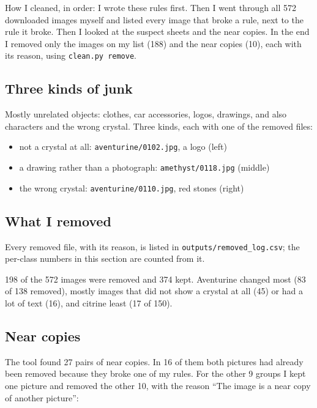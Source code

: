 \documentclass[11pt]{article}
\begin{document}
How I cleaned, in order: I wrote these rules first. Then I went through all
572 downloaded images myself and listed every image that broke a rule, next to
the rule it broke. Then I looked at the suspect sheets and the near copies. In
the end I removed only the images on my list (188) and the near copies (10),
each with its reason, using \texttt{clean.py remove}.

\subsection*{Three kinds of junk}
Mostly unrelated objects: clothes, car accessories, logos, drawings, and also
characters and the wrong crystal. Three kinds, each with one of the removed
files:

\begin{itemize}
\item not a crystal at all: \texttt{aventurine/0102.jpg}, a logo (left)
\item a drawing rather than a photograph: \texttt{amethyst/0118.jpg} (middle)
\item the wrong crystal: \texttt{aventurine/0110.jpg}, red stones (right)
\end{itemize}

\hfill
{}\hfill
{}

\subsection*{What I removed}

Every removed file, with its reason, is listed in
\texttt{outputs/removed\_log.csv}; the per-class numbers in this section are
counted from it.

198 of the 572 images were removed and 374 kept. Aventurine changed most (83 of
138 removed), mostly images that did not show a crystal at all (45) or had a lot
of text (16), and citrine least (17 of 150).

\subsection*{Near copies}
The tool found 27 pairs of near copies. In 16 of them both pictures had already
been removed because they broke one of my rules. For the other 9 groups I kept
one picture and removed the other 10, with the reason ``The image is a near copy
of another picture'':
\end{document}
